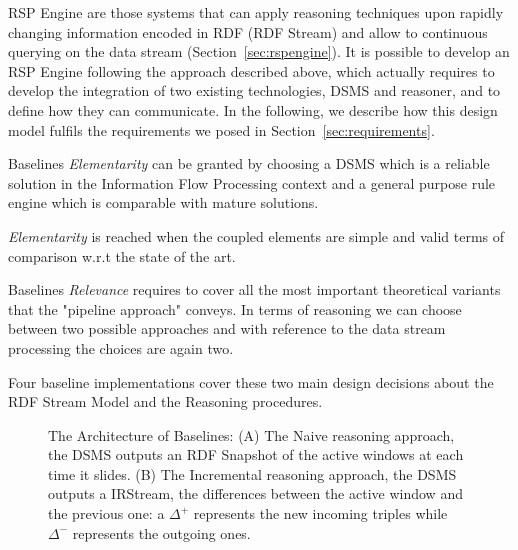 \noindent RSP Engine are those systems that can apply reasoning techniques upon rapidly changing information encoded in RDF (RDF Stream) and allow to continuous querying on the data stream (Section~\ref{sec:rspengine}). It is possible to develop an RSP Engine following the approach described above, which actually requires to develop the integration of two existing technologies, DSMS and reasoner, and to define how they can communicate. In the following, we describe how this design model fulfils the requirements we posed in Section~\ref{sec:requirements}.

Baselines \textit{Elementarity} can be granted by choosing a DSMS which is a reliable solution in the Information Flow Processing context and a general purpose rule engine which is comparable with mature solutions.

\textit{Elementarity} is reached when the coupled elements are simple and valid terms of comparison w.r.t the state of the art.

Baselines \textit{Relevance} requires to cover all the most important theoretical variants that the "pipeline approach" conveys. In terms of reasoning we can choose between two possible approaches and with reference to the data stream processing the choices are again two.

Four baseline implementations cover these two main design decisions about the RDF Stream Model and the Reasoning procedures. 

\begin{figure}[h!]
 \centering
{}
	\caption[\name Baselines Architecture]{The Architecture of \name Baselines: (A) The Naive reasoning approach, the DSMS outputs an RDF Snapshot of the active windows at each time it slides. (B) The Incremental reasoning approach, the DSMS outputs a IRStream, the differences between the active window and the previous one: a $\Delta^{+}$ represents the new incoming triples while $\Delta^{-}$ represents the outgoing ones.}
	\label{fig:baselines}
\end{figure}


